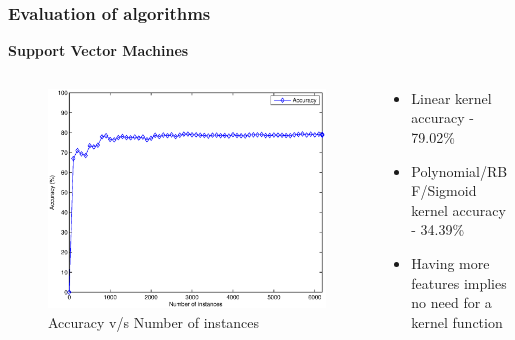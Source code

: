 \documentclass[9pt]{beamer}
\begin{document}
    \begin{frame}
        \frametitle{Evaluation of algorithms}
        \begin{center}
            \textbf{Support Vector Machines}
        \end{center}
        \begin{columns}
            \begin{column}{0.5\textwidth}
                \begin{figure}
                    \centering
                    \includegraphics[width=\textwidth]{figures/svm_accuracy.eps}
                    \caption{Accuracy v/s Number of instances}
                \end{figure}
            \end{column}
            \begin{column}{0.5\textwidth}
                \begin{itemize}
                    \item{Linear kernel accuracy - 79.02\%}
                    \item{Polynomial/RBF/Sigmoid kernel accuracy - 34.39\%}
                    \item{Having more features implies no need for a kernel function}
                \end{itemize}
            \end{column}
        \end{columns}
    \end{frame}
    
\end{document}
